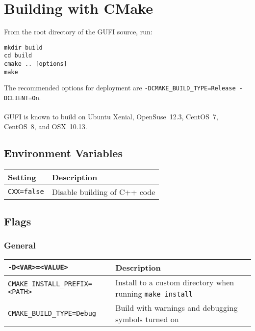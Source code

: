 \section{Building with CMake}

From the root directory of the GUFI source, run:
\begin{verbatim}
mkdir build
cd build
cmake .. [options]
make
\end{verbatim}

The recommended options for deployment are
\texttt{-DCMAKE\_BUILD\_TYPE=Release -DCLIENT=On}.
\\\\
GUFI is known to build on Ubuntu Xenial, OpenSuse~12.3, CentOS~7,
CentOS~8, and OSX~10.13.

\subsection{Environment Variables}
\begin{table}[h]
\centering
\begin{tabularx}{1.2\textwidth}{| l | X |}
  \hline
  Setting & Description \\
  \hline
  \texttt{CXX=false} & Disable building of C++ code \\
  \hline
\end{tabularx}
\end{table}

\subsection{Flags}

\subsubsection{General}
\begin{table}[h!]
\centering
\begin{tabularx}{1.2\textwidth}{| l | X |}
  \hline
  \texttt{-D<VAR>=<VALUE>} & Description \\
  \hline
  \texttt{CMAKE\_INSTALL\_PREFIX=<PATH>}
  & Install to a custom directory when running \texttt{make install} \\
  \hline
  \texttt{CMAKE\_BUILD\_TYPE=Debug}
  & Build with warnings and debugging symbols turned on \\
  \hline
\end{tabularx}
\end{table}

